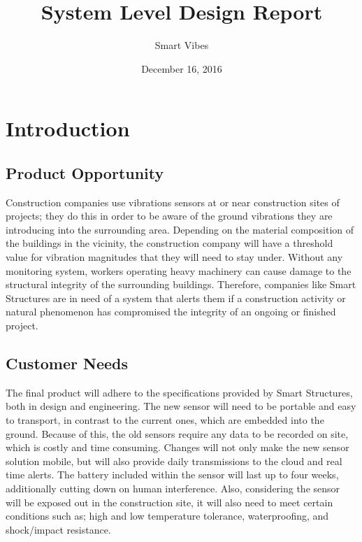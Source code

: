 \documentclass[12pt]{article}
\begin{document}
\title{System Level Design Report}
\author{Smart Vibes}
\date{December 16, 2016}
\maketitle

\newpage
\tableofcontents

\newpage
\section{Introduction}
\subsection{Product Opportunity}
Construction companies use vibrations sensors at or near construction sites of projects; they do this in order to be aware of the ground vibrations they are introducing into the surrounding area. Depending on the material composition of the buildings in the vicinity, the construction company will have a threshold value for vibration magnitudes  that they will need to stay under. Without any monitoring system, workers operating heavy machinery can cause damage to the structural integrity of the surrounding buildings. Therefore, companies like Smart Structures are in need of a system that alerts them if a construction activity or natural phenomenon has compromised the integrity of an ongoing or finished project.

\subsection{Customer Needs}
The final product will adhere to the specifications provided by Smart Structures, both in design and engineering. The new sensor will need to be portable and easy to transport, in contrast to the current ones, which are embedded into the ground. Because of this, the old sensors require any data to be recorded on site, which is costly and time consuming. Changes will not only make the new sensor solution mobile, but will also provide daily transmissions to the cloud and real time alerts. The battery included within the sensor will last up to four weeks, additionally cutting down on human interference. Also, considering the sensor will be exposed out in the construction site, it will also need to meet certain conditions such as; high and low temperature tolerance, waterproofing, and shock/impact resistance.
\end{document}
